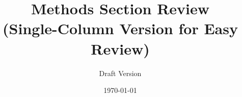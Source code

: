 \documentclass[12pt,a4paper]{article}
\begin{document}
\title{Methods Section Review\\
\large (Single-Column Version for Easy Review)}
\author{Draft Version}
\date{\today}
\maketitle



\end{document}
